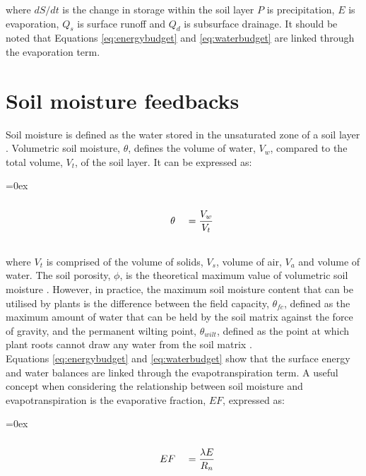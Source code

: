 \documentclass{icldt}\usepackage[]{graphicx}\usepackage[]{color}
\def\leftalgn{0.45}\def\rightalgn{0.45}
\def\algnrow{\rule{\leftalgn\textwidth}{0ex}&\rule{\rightalgn\textwidth}{0ex}}
\newenvironment{algneqn}{%
  \arraycolsep=0ex\renewcommand\arraystretch{0}%
  \begin{equation}%
  \begin{array}{rl}%
  \algnrow\\}%
 {\\\algnrow%
  \end{array}%
  \end{equation}\ignorespacesafterend%
}
\begin{document}
\noindent where $ dS/dt $ is the change in storage within the soil layer $ P $ is precipitation, $ E $ is evaporation, $ Q_{s} $ is surface runoff and $ Q_{d} $ is subsurface drainage. It should be noted that Equations \ref{eq:energybudget} and \ref{eq:waterbudget} are linked through the evaporation term. \\

%

\section{Soil moisture feedbacks}

Soil moisture is defined as the water stored in the unsaturated zone of a soil layer \citep{Hillel1998}. Volumetric soil moisture, $ \theta $, defines the volume of water, $ V_{w} $, compared to the total volume, $ V_{t} $, of the soil layer. It can be expressed as: 

\begin{algneqn} \label{eq:volumetric_sm}
\theta\ &= \dfrac{V_{w}}{V_{t}}
\end{algneqn}

\noindent where $ V_{t} $ is comprised of the volume of solids, $ V_{s} $, volume of air, $ V_{a} $ and volume of water. The soil porosity, $ \phi $, is the theoretical maximum value of volumetric soil moisture \citep{Shaw1994}. However, in practice, the maximum soil moisture content that can be utilised by plants is the difference between the field capacity, $ \theta_{fc} $, defined as the maximum amount of water that can be held by the soil matrix against the force of gravity, and the permanent wilting point, $ \theta_{wilt} $, defined as the point at which plant roots cannot draw any water from the soil matrix \citep{Shaw1994}. \\
   
Equations \ref{eq:energybudget} and \ref{eq:waterbudget} show that the surface energy and water balances are linked through the evapotranspiration term. A useful concept when considering the relationship between soil moisture and evapotranspiration is the evaporative fraction, $ EF $, expressed as:

\begin{algneqn} \label{eq:evaporativefraction}
EF\ &= \dfrac{\lambda E}{R_{n}}
\end{algneqn}
\end{document}
